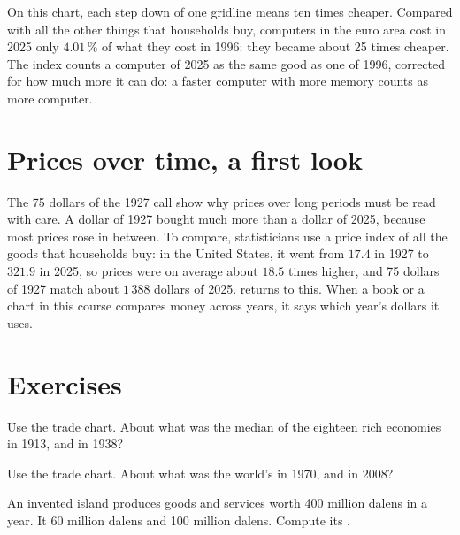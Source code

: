 On this chart, each step down of one gridline means ten times cheaper. Compared
with all the other things that households buy, computers in the euro area cost
in 2025 only $4.01\,\%$ of what they cost in 1996: they became about 25 times
cheaper. The index counts a computer of 2025 as the same good as one of 1996,
corrected for how much more it can do: a faster computer with more memory counts
as more computer.

\section{Prices over time, a first look}

The 75 dollars of the 1927 call show why prices over long periods must be read
with care. A dollar of 1927 bought much more than a dollar of 2025, because most
prices rose in between. To compare, statisticians use a price index of all the
goods that households buy: in the United States, it went from $17.4$ in 1927 to
$321.9$ in 2025, so prices were on average about $18.5$ times higher, and 75
dollars of 1927 match about $1\,388$ dollars of 2025.
 returns to this. When a book or a chart
in this course compares money across years, it says which year's dollars it uses.

\section{Exercises}

\begin{exercise}[$\star$]\label{exo:g6:a-connected-world:1}
Use the trade chart. About what was the median  of the eighteen rich
economies in 1913, and in 1938?
\end{exercise}

\begin{exercise}[$\star$]\label{exo:g6:a-connected-world:2}
Use the trade chart. About what was the world's  in 1970, and in 2008?
\end{exercise}

\begin{exercise}[$\star$]\label{exo:g6:a-connected-world:3}
An invented island produces goods and services worth 400 million dalens in a
year. It  60 million dalens and  100 million dalens. Compute its
.
\end{exercise}

